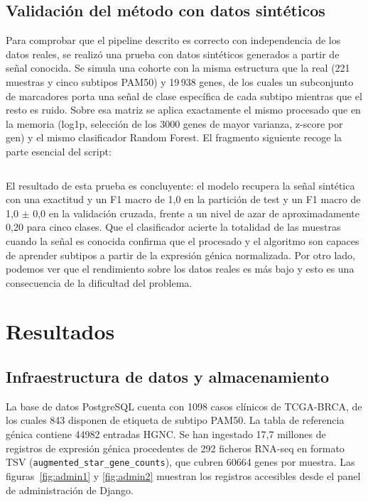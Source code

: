 \documentclass[12pt, a4paper]{report}
\begin{document}
\section{Validación del método con datos sintéticos}

Para comprobar que el pipeline descrito es correcto con independencia de los datos reales, se realizó una prueba con datos sintéticos generados a partir de señal conocida. Se simula una cohorte con la misma estructura que la real (221 muestras y cinco subtipos PAM50) y 19\,938 genes, de los cuales un subconjunto de marcadores porta una señal de clase específica de cada subtipo mientras que el resto es ruido. Sobre esa matriz se aplica exactamente el mismo procesado que en la memoria (log1p, selección de los 3000 genes de mayor varianza, z-score por gen) y el mismo clasificador Random Forest. El fragmento siguiente recoge la parte esencial del script:

\inputminted[firstline=27,lastline=78]{python}{../scripts/prueba_sintetica.py}

El resultado de esta prueba es concluyente: el modelo recupera la señal sintética con una exactitud y un F1 macro de 1,0 en la partición de test y un F1 macro de 1,0 $\pm$ 0,0 en la validación cruzada, frente a un nivel de azar de aproximadamente 0,20 para cinco clases. Que el clasificador acierte la totalidad de las muestras cuando la señal es conocida confirma que el procesado y el algoritmo son capaces de aprender subtipos a partir de la expresión génica normalizada. Por otro lado, podemos ver que el rendimiento sobre los datos reales es más bajo y esto es una consecuencia de la dificultad del problema.


\chapter{Resultados}

\section{Infraestructura de datos y almacenamiento}

La base de datos PostgreSQL cuenta con 1098 casos clínicos de TCGA-BRCA, de los cuales 843 disponen de etiqueta de subtipo PAM50. La tabla de referencia génica contiene 44982 entradas HGNC. Se han ingestado 17,7 millones de registros de expresión génica procedentes de 292 ficheros RNA-seq en formato TSV (\texttt{augmented\_star\_gene\_counts}), que cubren 60664 genes por muestra. Las figuras~\ref{fig:admin1} y \ref{fig:admin2} muestran los registros accesibles desde el panel de administración de Django.
\end{document}
